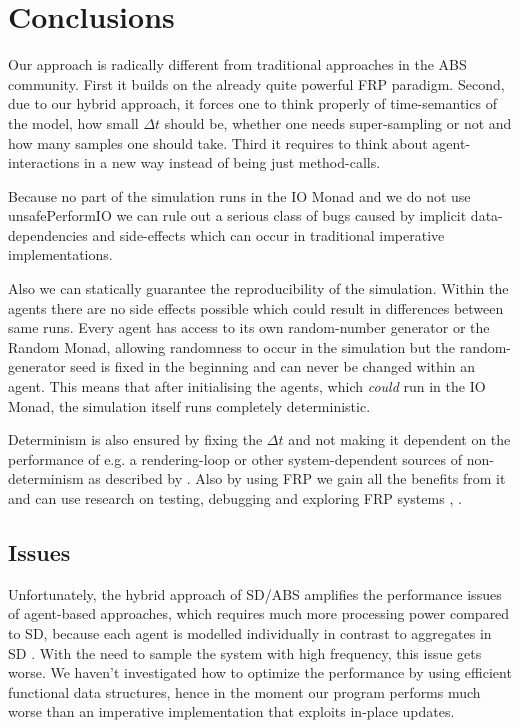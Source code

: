 \section{Conclusions}
\label{sec:conclusions}

Our approach is radically different from traditional approaches in the ABS community. First it builds on the already quite powerful FRP paradigm. Second, due to our hybrid approach, it forces one to think properly of time-semantics of the model, how small $\Delta t$ should be, whether one needs super-sampling or not and how many samples one should take. Third it requires to think about agent-interactions in a new way instead of being just method-calls.

Because no part of the simulation runs in the IO Monad and we do not use unsafePerformIO we can rule out a serious class of bugs caused by implicit data-dependencies and side-effects which can occur in traditional imperative implementations.

Also we can statically guarantee the reproducibility of the simulation. Within the agents there are no side effects possible which could result in differences between same runs. Every agent has access to its own random-number generator or the Random Monad, allowing randomness to occur in the simulation but the random-generator seed is fixed in the beginning and can never be changed within an agent. This means that after initialising the agents, which \textit{could} run in the IO Monad, the simulation itself runs completely deterministic.

Determinism is also ensured by fixing the $\Delta t$ and not making it dependent on the performance of e.g. a rendering-loop or other system-dependent sources of non-determinism as described by \cite{perez_testing_2017}. Also by using FRP we gain all the benefits from it and can use research on testing, debugging and exploring FRP systems \cite{perez_testing_2017}, \cite{perez_back_2017}.

\subsection*{Issues}
Unfortunately, the hybrid approach of SD/ABS amplifies the performance issues of agent-based approaches, which requires much more processing power compared to SD, because each agent is modelled individually in contrast to aggregates in SD \cite{macal_agent-based_2010}. With the need to sample the system with high frequency, this issue gets worse. We haven't investigated how to optimize the performance by using efficient functional data structures, hence in the moment our program performs much worse than an imperative implementation that exploits in-place updates.

